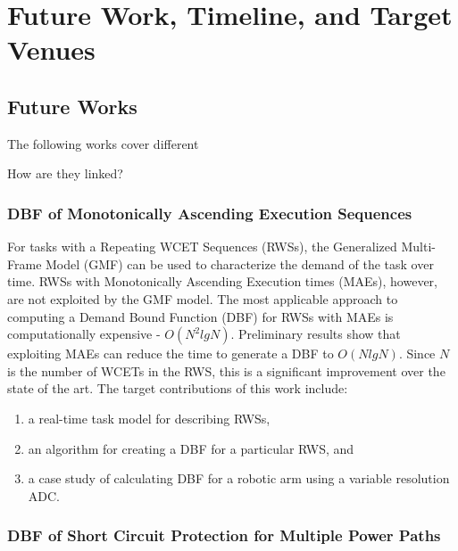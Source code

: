 \section{Future Work, Timeline, and Target Venues} \label{chap:futureWork}

\subsection{Future Works}

The following works cover different 

How are they linked?


\subsubsection{DBF of Monotonically Ascending Execution Sequences}

For tasks with a Repeating WCET Sequences (RWSs), the Generalized Multi-Frame Model (GMF) can be used to characterize the demand of the task over time.
RWSs with Monotonically Ascending Execution times (MAEs), however, are not exploited by the GMF model.
The most applicable approach to computing a Demand Bound Function (DBF) for RWSs with MAEs is computationally expensive - $O(N^2 lg N)$.
Preliminary results show that exploiting MAEs can reduce the time to generate a DBF to $O(N lg N)$.
Since $N$ is the number of WCETs in the RWS, this is a significant improvement over the state of the art.
The target contributions of this work include:
\begin{enumerate}
    \item a real-time task model for describing RWSs,
    \item an algorithm for creating a DBF for a particular RWS, and 
    \item a case study of calculating DBF for a robotic arm using a variable resolution ADC.
\end{enumerate}

\subsubsection{DBF of Short Circuit Protection for Multiple Power Paths}

